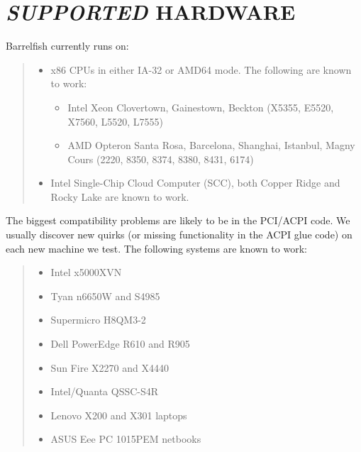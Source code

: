 \section{\emph{SUPPORTED} HARDWARE%
  \label{supported-hardware}%
}

Barrelfish currently runs on:
%
\begin{quote}
%
\begin{itemize}

\item x86 CPUs in either IA-32 or AMD64 mode. The following are known to work:
%
\begin{itemize}

\item Intel Xeon Clovertown, Gainestown, Beckton (X5355, E5520, X7560, L5520,
L7555)

\item AMD Opteron Santa Rosa, Barcelona, Shanghai, Istanbul, Magny Cours
(2220, 8350, 8374, 8380, 8431, 6174)

\end{itemize}

\item Intel Single-Chip Cloud Computer (SCC), both Copper Ridge and Rocky Lake
are known to work.

\end{itemize}

\end{quote}

The biggest compatibility problems are likely to be in the PCI/ACPI code. We
usually discover new quirks (or missing functionality in the ACPI glue code)
on each new machine we test. The following systems are known to work:
%
\begin{quote}
%
\begin{itemize}

\item Intel x5000XVN

\item Tyan n6650W and S4985

\item Supermicro H8QM3-2

\item Dell PowerEdge R610 and R905

\item Sun Fire X2270 and X4440

\item Intel/Quanta QSSC-S4R

\item Lenovo X200 and X301 laptops

\item ASUS Eee PC 1015PEM netbooks

\end{itemize}

\end{quote}

